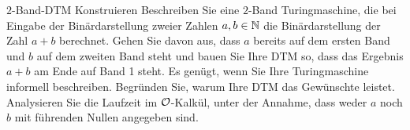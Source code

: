 \documentclass[answers]{submit}
\begin{document}
\begin{exercise}[6]{$2$-Band-DTM Konstruieren}
  Beschreiben Sie eine $2$-Band Turingmaschine, die bei Eingabe der Binärdarstellung zweier Zahlen $a,b\in\mathbb{N}$ die Binärdarstellung der Zahl $a+b$ berechnet.
  Gehen Sie davon aus, dass $a$ bereits auf dem ersten Band und $b$ auf dem zweiten Band steht und bauen Sie Ihre DTM so, dass das Ergebnis $a+b$ am Ende auf Band 1 steht.
  Es genügt, wenn Sie Ihre Turingmaschine informell beschreiben.
  Begründen Sie, warum Ihre DTM das Gewünschte leistet.
  Analysieren Sie die Laufzeit im $\mathcal{O}$-Kalkül, unter der Annahme, dass weder $a$ noch $b$ mit führenden Nullen angegeben sind.
\end{exercise}
\end{document}
